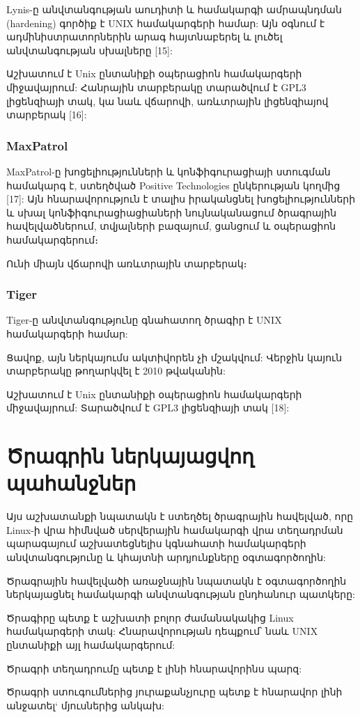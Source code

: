 \documentclass[a4paper,12pt]{article}
\begin{document}
\begin{sloppypar}
Lynis-ը անվտանգության աուդիտի և համակարգի ամրապնդման (hardening)
գործիք է UNIX համակարգերի համար:
Այն օգնում է ադմինիստրատորներին արագ հայտնաբերել և լուծել
անվտանգության սխալները [15]:

Աշխատում է Unix ընտանիքի օպերացիոն համակարգերի միջավայրում:
Հանրային տարբերակը տարածվում է GPL3 լիցենզիայի տակ, կա նաև վճարովի,
առևտրային լիցենզիայով տարբերակ [16]:


\subsubsection{MaxPatrol}


MaxPatrol-ը խոցելիությունների և կոնֆիգուրացիայի ստուգման համակարգ է,
ստեղծված Positive Technologies ընկերության կողմից [17]:
Այն հնարավորություն է տալիս իրականցնել խոցելիությունների և սխալ
կոնֆիգուրացիացիաների նույնականացում ծրագրային հավելվածներում,
տվյալների բազայում, ցանցում և օպերացիոն համակարգերում։

Ունի միայն վճարովի առևտրային տարբերակ։


\subsubsection{Tiger}


Tiger-ը անվտանգությունը գնահատող ծրագիր է UNIX համակարգերի համար:

Ցավոք, այն ներկայումս ակտիվորեն չի մշակվում: Վերջին կայուն տարբերակը
թողարկվել է 2010 թվականին:

Աշխատում է Unix ընտանիքի օպերացիոն համակարգերի միջավայրում:
Տարածվում է GPL3 լիցենզիայի տակ [18]:


\section{Ծրագրին ներկայացվող պահանջներ}


Այս աշխատանքի նպատակն է ստեղծել ծրագրային հավելված, որը Linux-ի
վրա հիմնված սերվերային համակարգի վրա տեղադրման պարագայում
աշխատեցնելիս կգնահատի համակարգերի անվտանգությունը և կհայտնի
արդյունքները օգտագործողին:

Ծրագրային հավելվածի առաջնային նպատակն է օգտագործողին ներկայացնել
համակարգի անվտանգության ընդհանուր պատկերը:

Ծրագիրը պետք է աշխատի բոլոր ժամանակակից Linux համակարգերի տակ:
Հնարավորության դեպքում՝ նաև UNIX ընտանիքի այլ համակարգերում:

Ծրագրի տեղադրումը պետք է լինի հնարավորինս պարզ:

Ծրագրի ստուգումներից յուրաքանչյուրը պետք է հնարավոր լինի անջատել`
մյուսներից անկախ:


\end{sloppypar}
\end{document}
